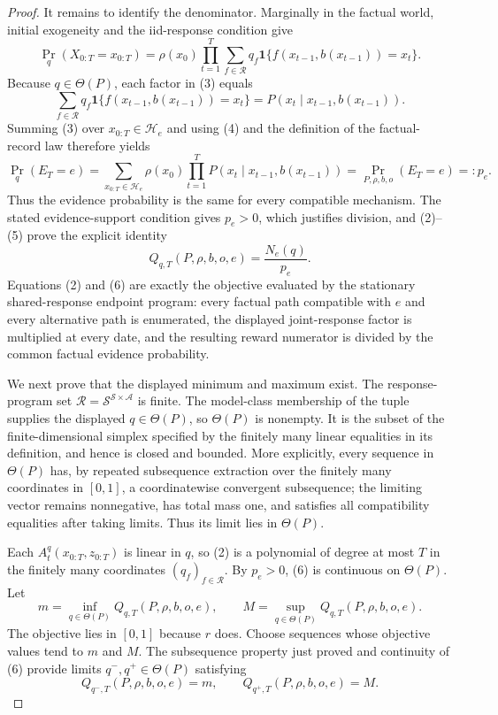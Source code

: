 \documentclass{article}
\begin{document}
\begin{proof}
It remains to identify the denominator.  Marginally in the factual world, initial exogeneity and the iid-response condition give
\[
 \Pr_q(X_{0:T}=x_{0:T})
 =\rho(x_0)\prod_{t=1}^T
   \sum_{f\in\mathcal R}q_f
   \mathbf 1\{f(x_{t-1},b(x_{t-1}))=x_t\}.                                 \tag{3}
\]
Because \(q\in\Theta(P)\), each factor in (3) equals
\[
 \sum_{f\in\mathcal R}q_f
 \mathbf 1\{f(x_{t-1},b(x_{t-1}))=x_t\}
 =P(x_t\mid x_{t-1},b(x_{t-1})).                                           \tag{4}
\]
Summing (3) over \(x_{0:T}\in\mathcal H_e\) and using (4) and the definition of the factual-record law therefore yields
\[
 \Pr_q(E_T=e)
 =\sum_{x_{0:T}\in\mathcal H_e}\rho(x_0)
   \prod_{t=1}^T P(x_t\mid x_{t-1},b(x_{t-1}))
 =\Pr_{P,\rho,b,o}(E_T=e)=:p_e.                                            \tag{5}
\]
Thus the evidence probability is the same for every compatible mechanism.  The stated evidence-support condition gives \(p_e>0\), which justifies division, and (2)--(5) prove the explicit identity
\[
 Q_{q,T}(P,\rho,b,o,e)=\frac{N_e(q)}{p_e}.                                  \tag{6}
\]
Equations (2) and (6) are exactly the objective evaluated by the stationary shared-response endpoint program: every factual path compatible with \(e\) and every alternative path is enumerated, the displayed joint-response factor is multiplied at every date, and the resulting reward numerator is divided by the common factual evidence probability.

We next prove that the displayed minimum and maximum exist.  The response-program set \(\mathcal R=\mathcal S^{\mathcal S\times\mathcal A}\) is finite.  The model-class membership of the tuple supplies the displayed \(q\in\Theta(P)\), so \(\Theta(P)\) is nonempty.  It is the subset of the finite-dimensional simplex specified by the finitely many linear equalities in its definition, and hence is closed and bounded.  More explicitly, every sequence in \(\Theta(P)\) has, by repeated subsequence extraction over the finitely many coordinates in \([0,1]\), a coordinatewise convergent subsequence; the limiting vector remains nonnegative, has total mass one, and satisfies all compatibility equalities after taking limits.  Thus its limit lies in \(\Theta(P)\).

Each \(A_t^q(x_{0:T},z_{0:T})\) is linear in \(q\), so (2) is a polynomial of degree at most \(T\) in the finitely many coordinates \((q_f)_{f\in\mathcal R}\).  By \(p_e>0\), (6) is continuous on \(\Theta(P)\).  Let
\[
 m=\inf_{q\in\Theta(P)}Q_{q,T}(P,\rho,b,o,e),\qquad
 M=\sup_{q\in\Theta(P)}Q_{q,T}(P,\rho,b,o,e).
\]
The objective lies in \([0,1]\) because \(r\) does.  Choose sequences whose objective values tend to \(m\) and \(M\).  The subsequence property just proved and continuity of (6) provide limits \(q^-,q^+\in\Theta(P)\) satisfying
\[
 Q_{q^-,T}(P,\rho,b,o,e)=m,
 \qquad
 Q_{q^+,T}(P,\rho,b,o,e)=M.                                                \tag{7}
\]


\end{proof}
\end{document}

